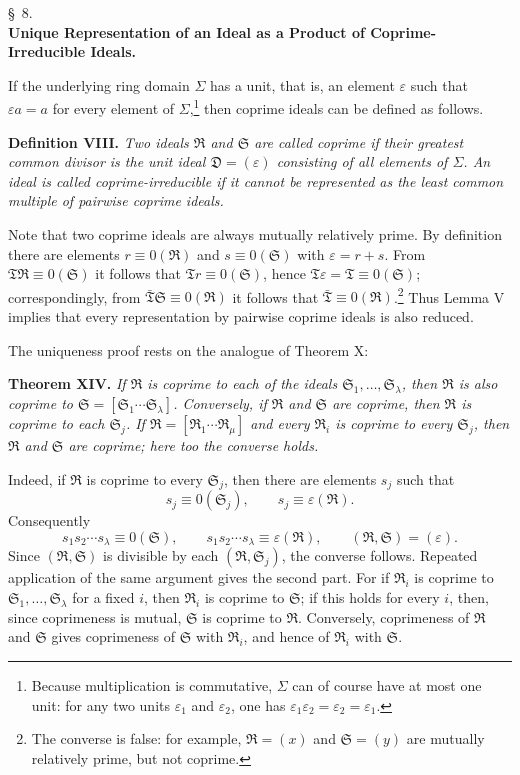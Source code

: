 \documentclass[11pt]{article}
\providecommand{\ideal}[1]{\mathfrak{#1}}
\begin{document}
\begin{center}
\S~8.\\[0.25em]
\textbf{Unique Representation of an Ideal as a Product of Coprime-Irreducible Ideals.}
\end{center}

If the underlying ring domain $\Sigma$ has a unit, that is, an element $\varepsilon$ such that $\varepsilon a=a$ for every element of $\Sigma$,\footnote{Because multiplication is commutative, $\Sigma$ can of course have at most one unit: for any two units $\varepsilon_1$ and $\varepsilon_2$, one has $\varepsilon_1\varepsilon_2=\varepsilon_2=\varepsilon_1$.} then coprime ideals can be defined as follows.

\textbf{Definition VIII.} \emph{Two ideals $\ideal R$ and $\ideal S$ are called coprime if their greatest common divisor is the unit ideal $\ideal D=(\varepsilon)$ consisting of all elements of $\Sigma$. An ideal is called coprime-irreducible if it cannot be represented as the least common multiple of pairwise coprime ideals.}

Note that two coprime ideals are always mutually relatively prime. By definition there are elements $r\equiv0(\ideal R)$ and $s\equiv0(\ideal S)$ with $\varepsilon=r+s$. From $\ideal T\ideal R\equiv0(\ideal S)$ it follows that $\ideal T r\equiv0(\ideal S)$, hence $\ideal T\varepsilon=\ideal T\equiv0(\ideal S)$; correspondingly, from $\bar{\ideal T}\ideal S\equiv0(\ideal R)$ it follows that $\bar{\ideal T}\equiv0(\ideal R)$.\footnote{The converse is false: for example, $\ideal R=(x)$ and $\ideal S=(y)$ are mutually relatively prime, but not coprime.} Thus Lemma V implies that every representation by pairwise coprime ideals is also reduced.

The uniqueness proof rests on the analogue of Theorem X:

\textbf{Theorem XIV.} \emph{If $\ideal R$ is coprime to each of the ideals $\ideal S_1,
\ldots,\ideal S_\lambda$, then $\ideal R$ is also coprime to $\ideal S=[\ideal S_1\cdots\ideal S_\lambda]$. Conversely, if $\ideal R$ and $\ideal S$ are coprime, then $\ideal R$ is coprime to each $\ideal S_j$. If $\ideal R=[\ideal R_1\cdots\ideal R_\mu]$ and every $\ideal R_i$ is coprime to every $\ideal S_j$, then $\ideal R$ and $\ideal S$ are coprime; here too the converse holds.}

Indeed, if $\ideal R$ is coprime to every $\ideal S_j$, then there are elements $s_j$ such that
\[
 s_j\equiv0(\ideal S_j),
 \qquad
 s_j\equiv\varepsilon(\ideal R).
\]
Consequently
\[
 s_1s_2\cdots s_\lambda\equiv0(\ideal S),
 \qquad
 s_1s_2\cdots s_\lambda\equiv\varepsilon(\ideal R),
 \qquad
 (\ideal R,
\ideal S)=(\varepsilon).
\]
Since $(\ideal R,
\ideal S)$ is divisible by each $(\ideal R,
\ideal S_j)$, the converse follows. Repeated application of the same argument gives the second part. For if $\ideal R_i$ is coprime to $\ideal S_1,
\ldots,\ideal S_\lambda$ for a fixed $i$, then $\ideal R_i$ is coprime to $\ideal S$; if this holds for every $i$, then, since coprimeness is mutual, $\ideal S$ is coprime to $\ideal R$. Conversely, coprimeness of $\ideal R$ and $\ideal S$ gives coprimeness of $\ideal S$ with $\ideal R_i$, and hence of $\ideal R_i$ with $\ideal S$.
\end{document}
